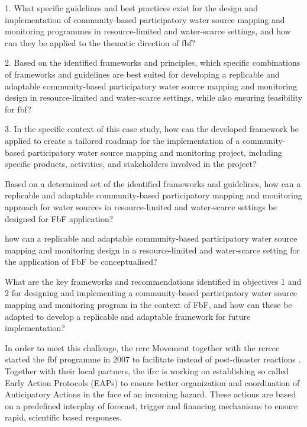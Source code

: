 1. What specific guidelines and best practices exist for the design and implementation of community-based participatory water source mapping and monitoring programmes in resource-limited and water-scarce settings, and how can they be applied to the thematic direction of \acrlong{fbf}? %

2. Based on the identified frameworks and principles, which specific combinations of frameworks and guidelines are best suited for developing a replicable and adaptable community-based participatory water source mapping and monitoring design in resource-limited and water-scarce settings, while also ensuring feasibility for \acrlong{fbf}?

3. In the specific context of this case study, how can the developed framework be applied to create a tailored roadmap for the implementation of a community-based participatory water source mapping and monitoring project, including specific products, activities, and stakeholders involved in the project?




Based on a determined set of the identified frameworks and guidelines, how can a replicable and adaptable community-based participatory mapping and monitoring approach for water sources in resource-limited and water-scarce settings be designed for FbF application?

how can a replicable and adaptable community-based participatory water source mapping and monitoring design in a resource-limited and water-scarce setting for the application of FbF be conceptualised?


What are the key frameworks and recommendations identified in objectives 1 and 2 for designing and implementing a community-based participatory water source mapping and monitoring program in the context of FbF, and how can these be adapted to develop a replicable and adaptable framework for future implementation?



In order to meet this challenge, the \acrlong{rcrc} Movement together with the \acrlong*{rcrccc} started the \acrfull*{fbf} programme in 2007 to facilitate  instead of post-disaster reactions \autocite{ifrcForecastbasedFinancingNew2019}. Together with their local partners, the \acrfull*{ifrc} is working on establishing so called Early Action Protocols (EAPs) to ensure better organization and coordination of Anticipatory Actions in the face of an incoming hazard. These actions are based on a predefined interplay of forecast, trigger and financing mechanisms to ensure rapid, scientific based responses.\newline

